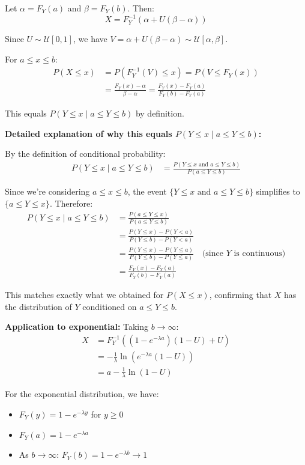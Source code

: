 Let $\alpha = F_Y(a)$ and $\beta = F_Y(b)$. Then:
\begin{equation*}
X = F_Y^{-1}(\alpha + U(\beta - \alpha))
\end{equation*}

Since $U \sim \mathcal{U}[0,1]$, we have $V = \alpha + U(\beta - \alpha) \sim \mathcal{U}[\alpha, \beta]$.

For $a \leq x \leq b$:
\begin{align*}
P(X \leq x) &= P(F_Y^{-1}(V) \leq x) = P(V \leq F_Y(x))\\
&= \frac{F_Y(x) - \alpha}{\beta - \alpha} = \frac{F_Y(x) - F_Y(a)}{F_Y(b) - F_Y(a)}
\end{align*}

This equals $P(Y \leq x \mid a \leq Y \leq b)$ by definition.

\textbf{Detailed explanation of why this equals $P(Y \leq x \mid a \leq Y \leq b)$:}

By the definition of conditional probability:
\begin{align*}
P(Y \leq x \mid a \leq Y \leq b) &= \frac{P(Y \leq x \text{ and } a \leq Y \leq b)}{P(a \leq Y \leq b)}
\end{align*}

Since we're considering $a \leq x \leq b$, the event $\{Y \leq x \text{ and } a \leq Y \leq b\}$ simplifies to $\{a \leq Y \leq x\}$. Therefore:
\begin{align*}
P(Y \leq x \mid a \leq Y \leq b) &= \frac{P(a \leq Y \leq x)}{P(a \leq Y \leq b)}\\
&= \frac{P(Y \leq x) - P(Y < a)}{P(Y \leq b) - P(Y < a)}\\
&= \frac{P(Y \leq x) - P(Y \leq a)}{P(Y \leq b) - P(Y \leq a)} \quad \text{(since $Y$ is continuous)}\\
&= \frac{F_Y(x) - F_Y(a)}{F_Y(b) - F_Y(a)}
\end{align*}

This matches exactly what we obtained for $P(X \leq x)$, confirming that $X$ has the distribution of $Y$ conditioned on $a \leq Y \leq b$.


\textbf{Application to exponential:} Taking $b \to \infty$:
\begin{align*}
X &= F_Y^{-1}((1-e^{-\lambda a})(1-U) + U)\\
&= -\frac{1}{\lambda}\ln(e^{-\lambda a}(1-U))\\
&= a - \frac{1}{\lambda}\ln(1-U)
\end{align*}

For the exponential distribution, we have:
\begin{itemize}
\item $F_Y(y) = 1 - e^{-\lambda y}$ for $y \geq 0$
\item $F_Y(a) = 1 - e^{-\lambda a}$
\item As $b \to \infty$: $F_Y(b) = 1 - e^{-\lambda b} \to 1$
\end{itemize}

